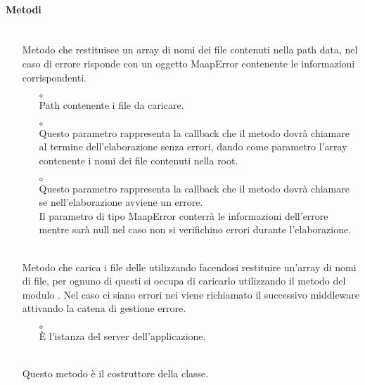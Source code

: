 \paragraph*{Metodi}
\begin{itemize}
\item[]  \\ Metodo che restituisce un array di nomi dei file contenuti nella path  data, nel caso di errore risponde con un oggetto MaapError contenente le informazioni corrispondenti.
\begin{itemize}\addtolength{\itemsep}{-0.5\baselineskip}
\item[$\circ$]  \\ Path contenente i file  da caricare.
\item[$\circ$]  \\ Questo parametro rappresenta la callback che il metodo dovrà chiamare al termine dell'elaborazione senza errori, dando come parametro l'array contenente i nomi dei file contenuti nella root.
\item[$\circ$]  \\ Questo parametro rappresenta la callback che il metodo dovrà chiamare se nell'elaborazione avviene un errore. \\ Il parametro di tipo MaapError conterrà le informazioni dell'errore mentre sarà null nel caso non si verifichino errori durante l'elaborazione.
\end{itemize}
\item[]  \\ Metodo che carica i file  delle  utilizzando  facendosi restituire un'array di nomi di file, per ognuno di questi si occupa di caricarlo utilizzando il metodo  del modulo . Nel caso ci siano errori nei  viene richiamato il successivo middleware attivando la catena di gestione errore.
\begin{itemize}\addtolength{\itemsep}{-0.5\baselineskip}
\item[$\circ$]  \\ È l'istanza del server dell'applicazione.
\end{itemize}
\item[]  \\ Questo metodo è il costruttore della classe.
\end{itemize}

